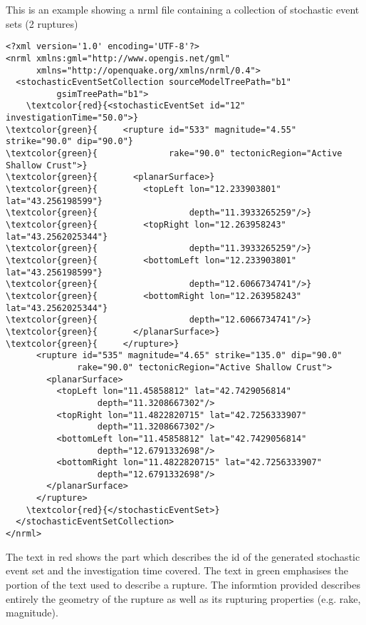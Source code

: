 This is an example showing a nrml file containing a collection of 
stochastic event sets (2 ruptures)
\begin{Verbatim}[frame=single, commandchars=\\\{\}, fontsize=\small]
<?xml version='1.0' encoding='UTF-8'?>
<nrml xmlns:gml="http://www.opengis.net/gml" 
	  xmlns="http://openquake.org/xmlns/nrml/0.4">
  <stochasticEventSetCollection sourceModelTreePath="b1" 
          gsimTreePath="b1">
    \textcolor{red}{<stochasticEventSet id="12" investigationTime="50.0">}
\textcolor{green}{     <rupture id="533" magnitude="4.55" strike="90.0" dip="90.0"}
\textcolor{green}{              rake="90.0" tectonicRegion="Active Shallow Crust">}
\textcolor{green}{       <planarSurface>}
\textcolor{green}{         <topLeft lon="12.233903801" lat="43.256198599"}
\textcolor{green}{                  depth="11.3933265259"/>}
\textcolor{green}{         <topRight lon="12.263958243" lat="43.2562025344"}
\textcolor{green}{                  depth="11.3933265259"/>}
\textcolor{green}{         <bottomLeft lon="12.233903801" lat="43.256198599"}
\textcolor{green}{                  depth="12.6066734741"/>}
\textcolor{green}{         <bottomRight lon="12.263958243" lat="43.2562025344"}
\textcolor{green}{                  depth="12.6066734741"/>}
\textcolor{green}{       </planarSurface>}
\textcolor{green}{     </rupture>}
      <rupture id="535" magnitude="4.65" strike="135.0" dip="90.0" 
              rake="90.0" tectonicRegion="Active Shallow Crust">
        <planarSurface>
          <topLeft lon="11.45858812" lat="42.7429056814" 
                  depth="11.3208667302"/>
          <topRight lon="11.4822820715" lat="42.7256333907" 
                  depth="11.3208667302"/>
          <bottomLeft lon="11.45858812" lat="42.7429056814" 
                  depth="12.6791332698"/>
          <bottomRight lon="11.4822820715" lat="42.7256333907" 
                  depth="12.6791332698"/>
        </planarSurface>
      </rupture>
    \textcolor{red}{</stochasticEventSet>}
  </stochasticEventSetCollection>
</nrml>
\end{Verbatim}

The text in red shows the part which describes the id of the generated
stochastic event set and the investigation time covered.
%
The text in green emphasises the portion of the text used to describe 
a rupture. The informtion provided describes entirely the geometry of
the rupture as well as its rupturing properties (e.g. rake, magnitude).

